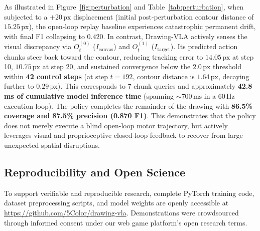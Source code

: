 \documentclass[10pt,twocolumn,letterpaper]{article}
\begin{document}
As illustrated in Figure~\ref{fig:perturbation} and Table~\ref{tab:perturbation}, when subjected to a $+20\,\text{px}$ displacement (initial post-perturbation contour distance of $15.25\,\text{px}$), the open-loop replay baseline experiences catastrophic permanent drift, with final F1 collapsing to $0.420$. In contrast, Drawing-VLA actively senses the visual discrepancy via $O_t^{(0)}$ ($I_{\text{canvas}}$) and $O_t^{(1)}$ ($I_{\text{target}}$). Its predicted action chunks steer back toward the contour, reducing tracking error to $14.05\,\text{px}$ at step 10, $10.75\,\text{px}$ at step 20, and sustained convergence below the $2.0\,\text{px}$ threshold within \textbf{42 control steps} (at step $t=192$, contour distance is $1.64\,\text{px}$, decaying further to $0.29\,\text{px}$). This corresponds to 7 chunk queries and approximately \textbf{42.8\,ms of cumulative model inference time} (spanning $\sim 700\,\text{ms}$ in a 60\,Hz execution loop). The policy completes the remainder of the drawing with \textbf{86.5\% coverage and 87.5\% precision (0.870 F1)}. This demonstrates that the policy does not merely execute a blind open-loop motor trajectory, but actively leverages visual and proprioceptive closed-loop feedback to recover from large unexpected spatial disruptions.

\subsection{Reproducibility and Open Science}
To support verifiable and reproducible research, complete PyTorch training code, dataset preprocessing scripts, and model weights are openly accessible at \url{https://github.com/5Color/drawing-vla}. Demonstrations were crowdsourced through informed consent under our web game platform's open research terms.
\end{document}
